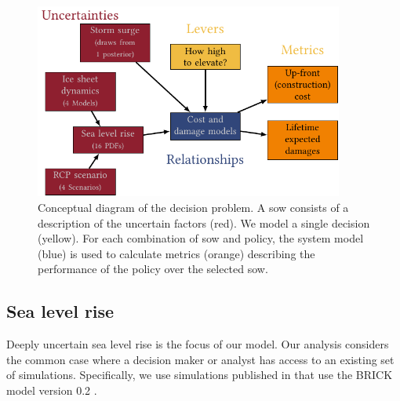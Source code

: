 \documentclass[12pt]{article}
\begin{document}
\begin{figure}
    \centering
    \includegraphics[width=4in]{xlrm.pdf}
    \caption{
        Conceptual diagram of the decision problem.
        A \gls{sow} consists of a description of the uncertain factors (red).
        We model a single decision (yellow).
        For each combination of \gls{sow} and policy, the system model (blue) is used to calculate metrics (orange) describing the performance of the policy over the selected \gls{sow}.
    }\label{fig:xlrm}
\end{figure}

\subsection{Sea level rise}\label{sec:sea-level}

Deeply uncertain sea level rise is the focus of our model.
Our analysis considers the common case where a decision maker or analyst has access to an existing set of simulations.
Specifically, we use simulations published in \citet{ruckart_hazardous:2008} that use the BRICK model version 0.2 \citep{wong_brick0.2:2017}.
\end{document}
